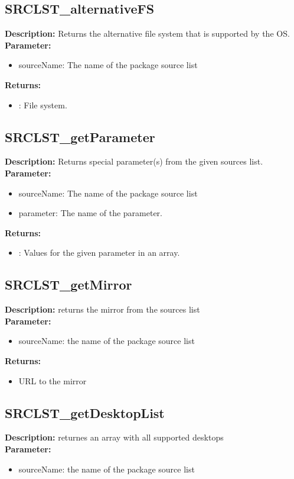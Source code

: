 \subsection{SRCLST\_alternativeFS}
\textbf{Description:} Returns the alternative file system that is supported by the OS.\\
\textbf{Parameter:}
\begin{itemize}
\item sourceName: The name of the package source list
\end{itemize}
\textbf{Returns:}
\begin{itemize}
\item : File system.
\end{itemize}

\subsection{SRCLST\_getParameter}
\textbf{Description:} Returns special parameter(s) from the given sources list.\\
\textbf{Parameter:}
\begin{itemize}
\item sourceName: The name of the package source list
\item parameter: The name of the parameter.
\end{itemize}
\textbf{Returns:}
\begin{itemize}
\item : Values for the given parameter in an array.
\end{itemize}

\subsection{SRCLST\_getMirror}
\textbf{Description:} returns the mirror from the sources list\\
\textbf{Parameter:}
\begin{itemize}
\item sourceName: the name of the package source list
\end{itemize}
\textbf{Returns:}
\begin{itemize}
\item URL to the mirror
\end{itemize}

\subsection{SRCLST\_getDesktopList}
\textbf{Description:} returnes an array with all supported desktops\\
\textbf{Parameter:}
\begin{itemize}
\item sourceName: the name of the package source list
\end{itemize}

